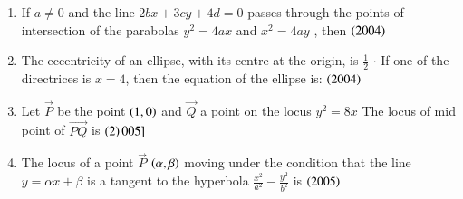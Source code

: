 \documentclass[journal,12pt,twocolumn]{IEEEtran}
\theoremstyle{remark}
\begin{document}
\begin{enumerate}
\begin{enumerate}[label=(\alph*)]
\end{enumerate}
\hfill
\item If  $ a \neq 0 $ and the line {$ 2bx +3cy + 4d = 0 $} passes through the points of intersection of the parabolas {$ y^2 = 4ax $} and {$  x^2 = 4ay $} , then 
\hfill
\hfill{{$\left(2004\right) $}}
\begin{enumerate}[label=(\alph*)]
\end{enumerate}
\hfill
\item The eccentricity of an ellipse, with its centre at the origin, is {$ \frac{1}{2} $} {$ \cdot $} If one of the directrices is {$ x = 4 $}, then the equation of the ellipse is: \hfill{{$ \left(2004\right) $}}
\begin{enumerate}[label=(\alph*)]
\end{enumerate}
\hfill 
\item Let {$\vec{P}$} be the point {$ \left(1,0\right) $} and {$\vec{Q}$} a point on the locus {$ y^2 = 8x $} The locus of mid point of {$\vec{PQ}$} is \hfill{{$ \left(2\right)005] $}}
\begin{enumerate}[label=(\alph*)]
\end{enumerate}
\hfill
\item The locus of a point {$\vec{P}$} {$ \left(\alpha,\beta\right) $} moving under the condition that the line {$ y = \alpha x + \beta $} is a tangent to the hyperbola {$ \frac{x^2}{a^2} - \frac{y^2}{b^2} $} is \hfill{{$ \left(2005\right) $}}

\end{enumerate}
\end{document}

